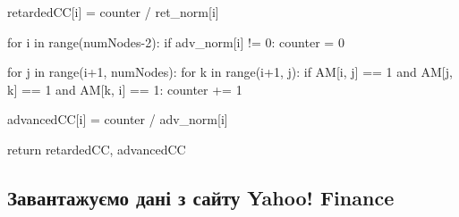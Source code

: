 \documentclass[
  letterpaper,
]{report}
\newenvironment{Shaded}{\begin{snugshade}}{\end{snugshade}}
\newcommand{\BuiltInTok}[1]{\textcolor[rgb]{0.00,0.23,0.31}{#1}}
\newcommand{\ControlFlowTok}[1]{\textcolor[rgb]{0.00,0.23,0.31}{#1}}
\newcommand{\DecValTok}[1]{\textcolor[rgb]{0.68,0.00,0.00}{#1}}
\newcommand{\KeywordTok}[1]{\textcolor[rgb]{0.00,0.23,0.31}{#1}}
\newcommand{\NormalTok}[1]{\textcolor[rgb]{0.00,0.23,0.31}{#1}}
\newcommand{\OperatorTok}[1]{\textcolor[rgb]{0.37,0.37,0.37}{#1}}
\begin{document}
\begin{Shaded}
\begin{Highlighting}[]
\NormalTok{            retardedCC[i] }\OperatorTok{=}\NormalTok{ counter }\OperatorTok{/}\NormalTok{ ret\_norm[i]}
    
    \ControlFlowTok{for}\NormalTok{ i }\KeywordTok{in} \BuiltInTok{range}\NormalTok{(numNodes}\OperatorTok{{-}}\DecValTok{2}\NormalTok{):}
        \ControlFlowTok{if}\NormalTok{ adv\_norm[i] }\OperatorTok{!=} \DecValTok{0}\NormalTok{: }
\NormalTok{            counter }\OperatorTok{=} \DecValTok{0}
            
            \ControlFlowTok{for}\NormalTok{ j }\KeywordTok{in} \BuiltInTok{range}\NormalTok{(i}\OperatorTok{+}\DecValTok{1}\NormalTok{, numNodes):}
                \ControlFlowTok{for}\NormalTok{ k }\KeywordTok{in} \BuiltInTok{range}\NormalTok{(i}\OperatorTok{+}\DecValTok{1}\NormalTok{, j): }
                    \ControlFlowTok{if}\NormalTok{ AM[i, j] }\OperatorTok{==} \DecValTok{1} \KeywordTok{and}\NormalTok{ AM[j, k] }\OperatorTok{==} \DecValTok{1} \KeywordTok{and}\NormalTok{ AM[k, i] }\OperatorTok{==} \DecValTok{1}\NormalTok{: }
\NormalTok{                        counter }\OperatorTok{+=} \DecValTok{1}
                        
\NormalTok{            advancedCC[i] }\OperatorTok{=}\NormalTok{ counter }\OperatorTok{/}\NormalTok{ adv\_norm[i]}
                 
                
    \ControlFlowTok{return}\NormalTok{ retardedCC, advancedCC}
    
\end{Highlighting}
\end{Shaded}

\hypertarget{ux437ux430ux432ux430ux43dux442ux430ux436ux443ux454ux43cux43e-ux434ux430ux43dux456-ux437-ux441ux430ux439ux442ux443-yahoo-finance}{%
\subsection{Завантажуємо дані з сайту Yahoo!
Finance}\label{ux437ux430ux432ux430ux43dux442ux430ux436ux443ux454ux43cux43e-ux434ux430ux43dux456-ux437-ux441ux430ux439ux442ux443-yahoo-finance}}
\end{document}
